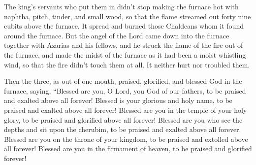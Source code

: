 The king's servants who put them in didn't stop making
the furnace hot with naphtha, pitch, tinder, and small wood,
 so that the flame streamed out forty nine cubits above
the furnace.  It spread and burned those Chaldeans whom
it found around the furnace.  But the angel of the Lord
came down into the furnace together with Azarias and his fellows, and he
struck the flame of the fire out of the furnace,  and
made the midst of the furnace as it had been a moist whistling wind, so
that the fire didn't touch them at all. It neither hurt nor troubled
them.

 Then the three, as out of one mouth, praised, glorified,
and blessed God in the furnace, saying,  ``Blessed are
you, O Lord, you God of our fathers, to be praised and exalted above all
forever!  Blessed is your glorious and holy name, to be
praised and exalted above all forever!  Blessed are you
in the temple of your holy glory, to be praised and glorified above all
forever!  Blessed are you who see the depths and sit upon
the cherubim, to be praised and exalted above all forever.
 Blessed are you on the throne of your kingdom, to be
praised and extolled above all forever!  Blessed are you
in the firmament of heaven, to be praised and glorified forever!


